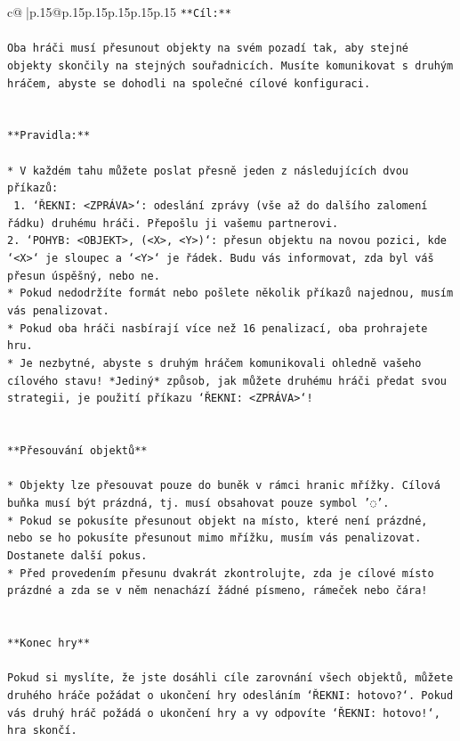 \documentclass{article}
\begin{document}
{\begin{supertabular}{c@{$\;$}|p{.15\linewidth}@{}p{.15\linewidth}p{.15\linewidth}p{.15\linewidth}p{.15\linewidth}p{.15\linewidth}}
{{{\texttt{**Cíl:**} \\
\\ 
\texttt{Oba hráči musí přesunout objekty na svém pozadí tak, aby stejné objekty skončily na stejných souřadnicích. Musíte komunikovat s druhým hráčem, abyste se dohodli na společné cílové konfiguraci.} \\
\\ 
\\ 
\texttt{**Pravidla:**} \\
\\ 
\texttt{* V každém tahu můžete poslat přesně jeden z následujících dvou příkazů:} \\
\texttt{ 1. `ŘEKNI: <ZPRÁVA>`: odeslání zprávy (vše až do dalšího zalomení řádku) druhému hráči. Přepošlu ji vašemu partnerovi.} \\
\texttt{2. `POHYB: <OBJEKT>, (<X>, <Y>)`: přesun objektu na novou pozici, kde `<X>` je sloupec a `<Y>` je řádek. Budu vás informovat, zda byl váš přesun úspěšný, nebo ne.} \\
\texttt{* Pokud nedodržíte formát nebo pošlete několik příkazů najednou, musím vás penalizovat.} \\
\texttt{* Pokud oba hráči nasbírají více než 16 penalizací, oba prohrajete hru.} \\
\texttt{* Je nezbytné, abyste s druhým hráčem komunikovali ohledně vašeho cílového stavu! *Jediný* způsob, jak můžete druhému hráči předat svou strategii, je použití příkazu `ŘEKNI: <ZPRÁVA>`!} \\
\\ 
\\ 
\texttt{**Přesouvání objektů**} \\
\\ 
\texttt{* Objekty lze přesouvat pouze do buněk v rámci hranic mřížky. Cílová buňka musí být prázdná, tj. musí obsahovat pouze symbol '◌'.} \\
\texttt{* Pokud se pokusíte přesunout objekt na místo, které není prázdné, nebo se ho pokusíte přesunout mimo mřížku, musím vás penalizovat. Dostanete další pokus.} \\
\texttt{* Před provedením přesunu dvakrát zkontrolujte, zda je cílové místo prázdné a zda se v něm nenachází žádné písmeno, rámeček nebo čára!} \\
\\ 
\\ 
\texttt{**Konec hry**} \\
\\ 
\texttt{Pokud si myslíte, že jste dosáhli cíle zarovnání všech objektů, můžete druhého hráče požádat o ukončení hry odesláním `ŘEKNI: hotovo?`. Pokud vás druhý hráč požádá o ukončení hry a vy odpovíte `ŘEKNI: hotovo!`, hra skončí.} \\
}}}
\end{supertabular}}
\end{document}

